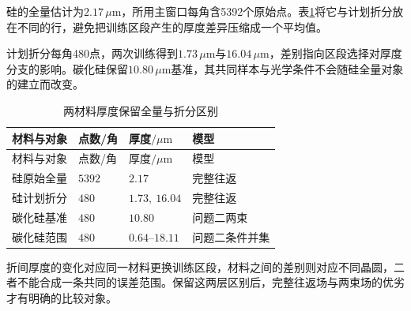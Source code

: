 硅的全量估计为$2.17\,\mu\mathrm{m}$，所用主窗口每角含5392个原始点。表\ref{tab:app-q3}将它与计划折分放在不同的行，避免把训练区段产生的厚度差异压缩成一个平均值。

计划折分每角480点，两次训练得到$1.73\,\mu\mathrm{m}$与$16.04\,\mu\mathrm{m}$，差别指向区段选择对厚度分支的影响。碳化硅保留$10.80\,\mu\mathrm{m}$基准，其共同样本与光学条件不会随硅全量对象的建立而改变。

\begingroup
\small
\begin{longtable}{>{\centering\arraybackslash}p{}>{\centering\arraybackslash}p{}>{\centering\arraybackslash}p{}>{\centering\arraybackslash}p{}}
\caption{两材料厚度保留全量与折分区别}\label{tab:app-q3}\\
\toprule
材料与对象 & 点数/角 & 厚度$/\mu\mathrm{m}$ & 模型 \\
\midrule
\endfirsthead
\toprule
材料与对象 & 点数/角 & 厚度$/\mu\mathrm{m}$ & 模型 \\
\midrule
\endhead
\bottomrule
\endfoot
硅原始全量 & $5392$ & $2.17$ & 完整往返 \\
硅计划折分 & $480$ & $1.73,\ 16.04$ & 完整往返 \\
碳化硅基准 & $480$ & $10.80$ & 问题二两束 \\
碳化硅范围 & $480$ & $0.64$--$18.11$ & 问题二条件并集 \\
\end{longtable}
\endgroup

折间厚度的变化对应同一材料更换训练区段，材料之间的差别则对应不同晶圆，二者不能合成一条共同的误差范围。保留这两层区别后，完整往返场与两束场的优劣才有明确的比较对象。

